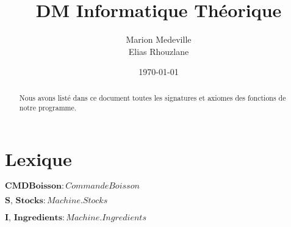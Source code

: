 \documentclass[]{article}
\date{}
\begin{document}
\title{DM Informatique Théorique}
\author{Marion Medeville \\
Elias Rhouzlane}
\date{\today}
 
\maketitle
\begin{abstract}
Nous avons listé dans ce document toutes les signatures et axiomes des fonctions de notre programme.
\end{abstract}
\section*{Lexique}
\begin{description}
  \item
 $ \textbf{CMDBoisson} : CommandeBoisson$
\item
   $\textbf{S, Stocks} : Machine.Stocks$
 \item
 $ \textbf{I, Ingredients} : Machine.Ingredients$
\end{description}
\end{document}

